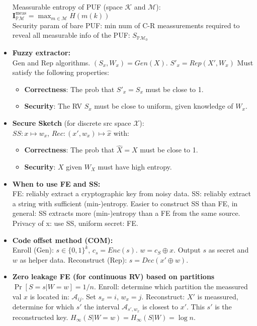 \documentclass[twocolumn,9pt]{extarticle}
\begin{document}
\begin{itemize}
	Meassurable entropy of PUF (space $\mathcal{K}$ and $\mathcal{M}$):\\
	$\mathbf{I}^\text{meas}_{\mathbb{P}\mathcal{M}} = \max_{m\in\mathcal{M}} H(m(k))$\\

	Security param of bare PUF: min num of C-R meassurements required to reveal all measurable info of the PUF: $S_{\mathbb{P}\mathcal{M}_0}$

	\item \textbf{Fuzzy extractor: } \\
	Gen and Rep algorithms. $(S_x,W_x) = Gen(X)$. $S'_x = Rep(X', W_x)$
	Must satisfy the following properties:
	\begin{itemize}
		\item \textbf{Correctness}: The prob that $S'_x = S_x$ must be close to 1.
		\item \textbf{Security}: The RV $S_x$ must be close to uniform, given knowledge of $W_x$.
	\end{itemize}

	\item \textbf{Secure Sketch} (for discrete src space $\mathcal{X}$):\\
	$SS: x \mapsto w_x$, $Rec: (x', w_x) \mapsto \hat{x}$ with:
	\begin{itemize}
		\item \textbf{Correctness}: The prob that $\hat{X} = X$ must be close to 1.
		\item \textbf{Security}: $X$ given $W_X$ must have high entropy.
	\end{itemize}

	\item \textbf{When to use FE and SS: } \\
	FE: reliably extract a cryptographic key from noisy data. SS: reliably extract a string with sufficient (min-)entropy. Easier to construct SS than FE, in general: SS extracts more (min-)entropy than a FE from the same source. Privacy of x: use SS, uniform secret: FE.

	\item \textbf{Code offset method (COM):} \\
	Enroll (Gen): $s \in \{0,1\}^k$, $c_s = Enc(s)$. $w = c_S \oplus x$. Output $s$ as secret and $w$ as helper data.
	Reconstruct (Rep): $\hat{s} = Dec(x' \oplus w)$.


	\item \textbf{Zero leakage FE (for continuous RV) based on partitions } \\
	$\Pr[S=s|W=w] = 1/n$. Enroll: determine which partition the meassured val $x$ is located in: $\mathcal{A}_{ij}$. Set $s_x = i$, $w_x = j$. Reconstruct: $X'$ is meassured, determine for which $s'$ the interval $\mathcal{A}_{s',w_x}$ is closest to $x'$. This $s'$ is the reconstructed key. $H_\infty(S|W=w) = H_\infty(S|W) = \log n$.


\end{itemize}
\end{document}
